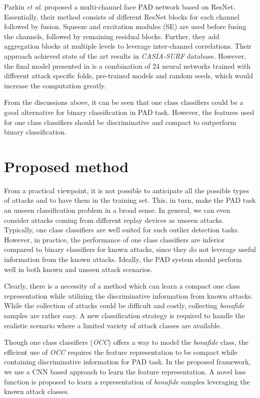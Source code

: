 \documentclass[journal]{IEEEtran}
\begin{document}
Parkin \textit{et al}. \cite{parkin2019recognizing} proposed a multi-channel face PAD network based on ResNet. Essentially, their method consists of different ResNet blocks for each channel followed by fusion. Squeeze and excitation modules (SE) are used before fusing the channels, followed by remaining residual blocks. Further, they add aggregation blocks at multiple levels to leverage inter-channel correlations. Their approach achieved state of the art results in \textit{CASIA-SURF} \cite{zhang2018casia} database. However, the final model presented in is a combination of 24 neural networks trained with different attack specific folds, pre-trained models and random seeds, which would increase the computation greatly.

From the discussions above, it can be seen that one class classifiers could be a good alternative for binary classification in PAD task. However, the features used for one class classifiers should be discriminative and compact to outperform binary classification.


\section{Proposed method}

From a practical viewpoint, it is not possible to anticipate all the possible types of attacks and to have them in the training set. This, in turn, make the PAD task an unseen classification problem in a broad sense. In general, we can even consider attacks coming from different replay devices as unseen attacks. Typically, one class classifiers are well suited for such outlier detection tasks. However, in practice, the performance of one class classifiers are inferior compared to binary classifiers for known attacks, since they do not leverage useful information from the known attacks. Ideally, the PAD system should perform well in both known and unseen attack scenarios.

Clearly, there is a necessity of a method which can learn a compact one class representation while utilizing the discriminative information from known attacks. While the collection of attacks could be difficult and costly, collecting \textit{bonafide} samples are rather easy. A new classification strategy is required to handle the realistic scenario where a limited variety of attack classes are available.

Though one class classifiers (\textit{OCC}) offers a way to model the \textit{bonafide} class, the efficient use of \textit{OCC} requires the feature representation to be compact while containing discriminative information for PAD task.
In the proposed framework, we use a CNN based approach to learn the feature representation. A novel loss function is proposed to learn a representation of \textit{bonafide} samples leveraging the known attack classes.
\end{document}
